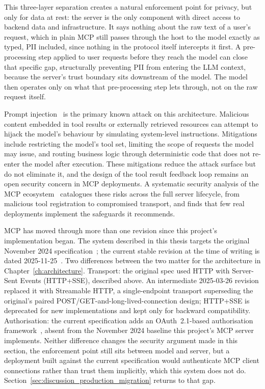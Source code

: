 This three-layer separation creates a natural enforcement point for privacy, but only for data at rest: the server is the only component with direct access to backend data and infrastructure. It says nothing about the raw text of a user's request, which in plain MCP still passes through the host to the model exactly as typed, PII included, since nothing in the protocol itself intercepts it first. A pre-processing step applied to user requests before they reach the model can close that specific gap, structurally preventing PII from entering the LLM context, because the server's trust boundary sits downstream of the model. The model then operates only on what that pre-processing step lets through, not on the raw request itself.

Prompt injection~\cite{greshake2023not} is the primary known attack on this architecture. Malicious content embedded in tool results or externally retrieved resources can attempt to hijack the model's behaviour by simulating system-level instructions. Mitigations include restricting the model's tool set, limiting the scope of requests the model may issue, and routing business logic through deterministic code that does not re-enter the model after execution. These mitigations reduce the attack surface but do not eliminate it, and the design of the tool result feedback loop remains an open security concern in MCP deployments. A systematic security analysis of the MCP ecosystem~\cite{hou2025mcpsecurity} catalogues these risks across the full server lifecycle, from malicious tool registration to compromised transport, and finds that few real deployments implement the safeguards it recommends.

MCP has moved through more than one revision since this project's implementation began. The system described in this thesis targets the original November 2024 specification~\cite{anthropic2024mcp}; the current stable revision at the time of writing is dated 2025-11-25~\cite{mcp2025specnov}. Two differences between the two matter for the architecture in Chapter~\ref{ch:architecture}. Transport: the original spec used HTTP with Server-Sent Events (HTTP+SSE), described above. An intermediate 2025-03-26 revision replaced it with Streamable HTTP, a single-endpoint transport superseding the original's paired POST/GET-and-long-lived-connection design; HTTP+SSE is deprecated for new implementations and kept only for backward compatibility. Authorisation: the current specification adds an OAuth~2.1-based authorisation framework~\cite{ietf2025oauth21}, absent from the November 2024 baseline this project's MCP server implements. Neither difference changes the security argument made in this section, the enforcement point still sits between model and server, but a deployment built against the current specification would authenticate MCP client connections rather than trust them implicitly, which this system does not do. Section~\ref{sec:discussion_production_migration} returns to that gap.

